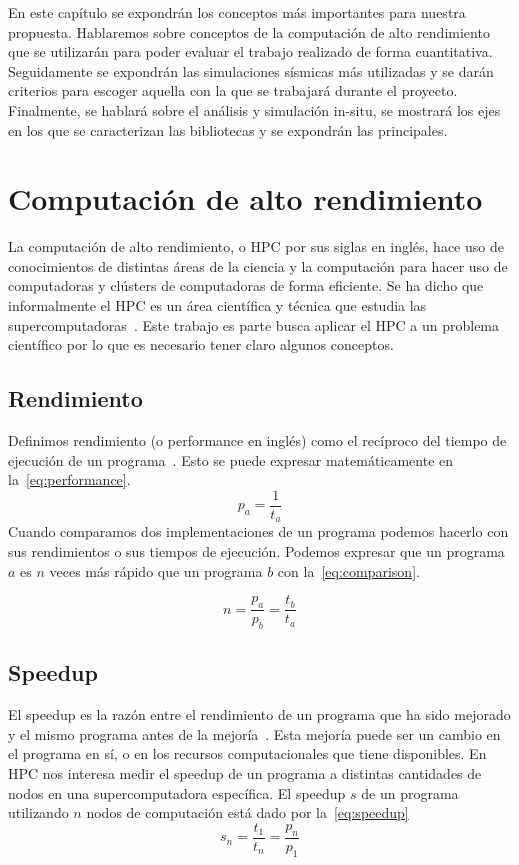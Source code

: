 En este capítulo se expondrán los conceptos más importantes para nuestra propuesta. Hablaremos sobre conceptos de la computación de alto rendimiento que se utilizarán para poder evaluar el trabajo realizado de forma cuantitativa. Seguidamente se expondrán las simulaciones sísmicas más utilizadas y se darán criterios para escoger aquella con la que se trabajará durante el proyecto. Finalmente, se hablará sobre el análisis y simulación in-situ, se mostrará los ejes en los que se caracterizan las bibliotecas y se expondrán las principales.
\section{Computación de alto rendimiento}
La computación de alto rendimiento, o HPC por sus siglas en inglés, hace uso de conocimientos de distintas áreas de la ciencia y la computación para hacer uso de computadoras y clústers de computadoras de forma eficiente. Se ha dicho que informalmente el HPC es un área científica y técnica que estudia las supercomputadoras~\cite{Nielsen2016}. Este trabajo es parte busca aplicar el HPC a un problema científico por lo que es necesario tener claro algunos conceptos.
\subsection{Rendimiento}
Definimos rendimiento (o performance en inglés) como el recíproco del tiempo de ejecución de un programa~\cite{Hennessy2017-ml}. Esto se puede expresar matemáticamente en la~\cref{eq:performance}.
\begin{equation}
  p_{a} = \frac{1}{t_a}
  \label{eq:performance}
\end{equation}
Cuando comparamos dos implementaciones de un programa podemos hacerlo con sus rendimientos o sus tiempos de ejecución. Podemos expresar que un programa $a$ es $n$ veces más rápido que un programa $b$ con la~\cref{eq:comparison}.

\begin{equation}
  n = \frac{p_a}{p_b} = \frac{t_b}{t_a}
  \label{eq:comparison}
\end{equation}

\subsection{Speedup}
El speedup es la razón entre el rendimiento de un programa que ha sido mejorado y el mismo programa antes de la mejoría~\cite{Hennessy2017-ml}. Esta mejoría puede ser un cambio en el programa en sí, o en los recursos computacionales que tiene disponibles.
En HPC nos interesa medir el speedup de un programa a distintas cantidades de nodos en una supercomputadora específica. El speedup $s$ de un programa utilizando $n$ nodos de computación está dado por la~\cref{eq:speedup}
\begin{equation}
  s_n = \frac{t_1}{t_n} = \frac{p_n}{p_1}
  \label{eq:speedup}
\end{equation}

